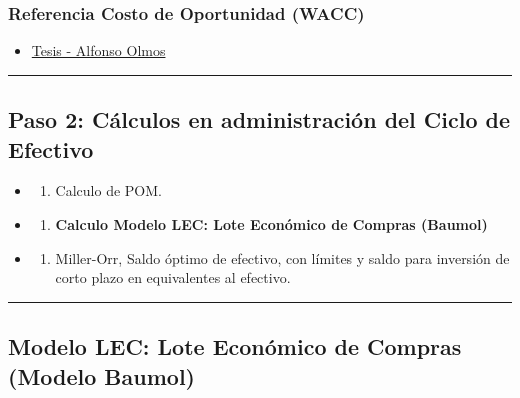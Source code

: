 \documentclass[
  letterpaper,
  DIV=11,
  numbers=noendperiod]{scrartcl}
\providecommand{\tightlist}{%
  \setlength{\itemsep}{0pt}\setlength{\parskip}{0pt}}\usepackage{longtable,booktabs,array}
\begin{document}
\subsubsection{Referencia Costo de Oportunidad
(WACC)}\label{referencia-costo-de-oportunidad-wacc}

\begin{itemize}
\tightlist
\item
  \href{https://repositorio.uchile.cl/bitstream/handle/2250/181880/Tesis\%20-\%20Alfonso\%20Olmos\%20-\%20Parte\%20II.pdf?sequence=2}{Tesis
  - Alfonso Olmos}
\end{itemize}

\begin{center}\rule{0.5\linewidth}{0.5pt}\end{center}

\subsection{Paso 2: Cálculos en administración del Ciclo de
Efectivo}\label{paso-2-cuxe1lculos-en-administraciuxf3n-del-ciclo-de-efectivo-1}

\begin{itemize}
\tightlist
\item
  \begin{enumerate}
  \def\labelenumi{\arabic{enumi}.}
  \tightlist
  \item
    Calculo de POM.
  \end{enumerate}
\item
  \begin{enumerate}
  \def\labelenumi{\arabic{enumi}.}
  \setcounter{enumi}{1}
  \tightlist
  \item
    \textbf{Calculo Modelo LEC: Lote Económico de Compras (Baumol)}
  \end{enumerate}
\item
  \begin{enumerate}
  \def\labelenumi{\arabic{enumi}.}
  \setcounter{enumi}{2}
  \tightlist
  \item
    Miller-Orr, Saldo óptimo de efectivo, con límites y saldo para
    inversión de corto plazo en equivalentes al efectivo.
  \end{enumerate}
\end{itemize}

\begin{center}\rule{0.5\linewidth}{0.5pt}\end{center}

\subsection{Modelo LEC: Lote Económico de Compras (Modelo
Baumol)}\label{modelo-lec-lote-econuxf3mico-de-compras-modelo-baumol}
\end{document}
